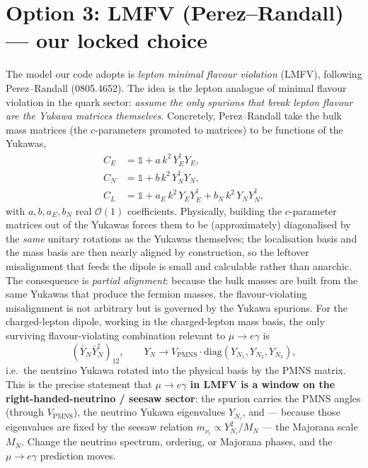 \documentclass[11pt]{article}
\newcommand{\YN}{Y_N}
\newcommand{\YNb}{\bar Y_N}
\newcommand{\spur}{(\YNb\YNb^\dagger)_{12}}
\newcommand{\Vpmns}{V_{\mathrm{PMNS}}}
\theoremstyle{definition}
\begin{document}
\section{Option 3: LMFV (Perez--Randall) --- our locked choice}
\label{sec:lmfv}

The model our code adopts is \emph{lepton minimal flavour violation} (LMFV),
following Perez--Randall (0805.4652). The idea is the lepton analogue of minimal
flavour violation in the quark sector: \emph{assume the only spurions that break
lepton flavour are the Yukawa matrices themselves}. Concretely, Perez--Randall
take the bulk mass matrices (the $c$-parameters promoted to matrices) to be
functions of the Yukawas,
\begin{align}
C_E &= \mathbb{1} + a\,k^2\,Y_E^\dagger Y_E, \nonumber\\
C_N &= \mathbb{1} + b\,k^2\,Y_N^\dagger Y_N, \\
C_L &= \mathbb{1} + a_E\,k^2\,Y_E Y_E^\dagger + b_N\,k^2\,Y_N Y_N^\dagger,
\nonumber
\end{align}
with $a,b,a_E,b_N$ real $\mathcal{O}(1)$ coefficients. Physically, building the
$c$-parameter matrices out of the Yukawas forces them to be (approximately)
diagonalised by the \emph{same} unitary rotations as the Yukawas themselves; the
localisation basis and the mass basis are then nearly aligned by construction, so
the leftover misalignment that feeds the dipole is small and calculable rather than
anarchic. The consequence is \emph{partial alignment}: because the bulk masses are
built from the same Yukawas that produce the fermion masses, the flavour-violating
misalignment is not arbitrary but is governed by the Yukawa spurions. For the charged-lepton dipole,
working in the charged-lepton mass basis, the only surviving flavour-violating
combination relevant to $\mu\to e\gamma$ is
\begin{equation}
\spur, \qquad \YN \to \Vpmns\cdot\mathrm{diag}(Y_{N_1},Y_{N_2},Y_{N_3}),
\label{eq:YNrot}
\end{equation}
i.e.\ the neutrino Yukawa rotated into the physical basis by the PMNS matrix.
This is the precise statement that \textbf{$\mu\to e\gamma$ in LMFV is a window on
the right-handed-neutrino / seesaw sector}: the spurion carries the PMNS angles
(through $\Vpmns$), the neutrino Yukawa eigenvalues $Y_{N_i}$, and --- because
those eigenvalues are fixed by the seesaw relation
$m_{\nu_i}\propto Y_{N_i}^2/M_N$ --- the Majorana scale $M_N$. Change the neutrino
spectrum, ordering, or Majorana phases, and the $\mu\to e\gamma$ prediction moves.
\end{document}
